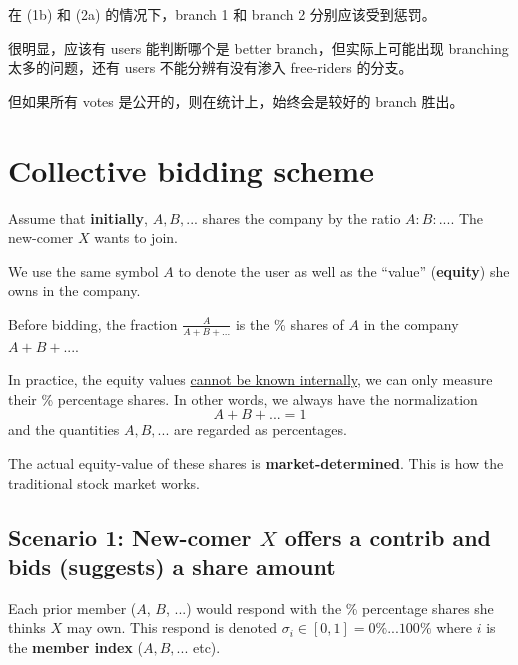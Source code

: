 \documentclass[12pt, orivec]{article}
\newcommand{\cc}[2]{#1}
\newcommand{\cc}[2]{#2}
\begin{document}
\cc{
在 (1b) 和 (2a) 的情况下，branch 1 和 branch 2 分别应该受到惩罚。
}{
In cases (1b) and (2a), branch 1 and 2 should be penalized respectively.
}

\cc{
很明显，应该有 users 能判断哪个是 better branch，但实际上可能出现 branching 太多的问题，还有 users 不能分辨有没有渗入 free-riders 的分支。 
}{
Obviously, there should be users who can determine which branches are better, but in practice there may be too many branches to consider.  Users may be unable to tell which branches are contaminated with free-riders. 
}

\cc{
但如果所有 votes 是公开的，则在统计上，始终会是较好的 branch 胜出。 
}{
However, if all votes are openly visible, then statistically we may believe that good branches will win out eventually.	
}

\section{Collective bidding scheme}

Assume that \textbf{initially}, $A, B, ...$ shares the company by the ratio $A : B : ...$.  The new-comer $X$ wants to join.

We use the same symbol $A$ to denote the user as well as the ``value'' (\textbf{equity}) she owns in the company.  

Before bidding, the fraction $\frac{A}{A + B + ...}$ is the \% shares of $A$ in the company $A + B + ...$.

In practice, the equity values \uline{cannot be known internally}, we can only measure their \% percentage shares.  In other words, we always have the normalization
\begin{equation}
A + B + ... = 1
\end{equation}
and the quantities $A, B, ...$ are regarded as percentages.

The actual equity-value of these shares is \textbf{market-determined}.  This is how the traditional stock market works.

\subsection{Scenario 1:  New-comer $X$ offers a contrib and bids (suggests) a share amount}

Each prior member ($A$, $B$, ...) would respond with the \% percentage shares she thinks $X$ may own.  This respond is denoted $\sigma_i \in [0,1] = 0\% ... 100\%$ where $i$ is the \textbf{member index} ($A, B, ... $ etc).
\end{document}

